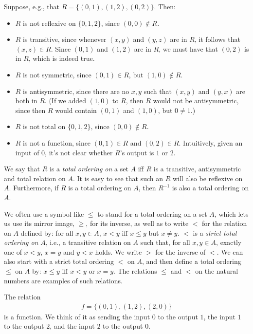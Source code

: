 Suppose, e.g., that $R=\{(0,1),(1,2),(0,2)\}$.
Then:
\begin{itemize}
\item $R$ is not reflexive on $\{0,1,2\}$, since $(0,0)\not\in R$.

\item $R$ is transitive, since whenever $(x,y)$ and $(y,z)$
are in $R$, it follows that $(x,z)\in R$.  Since
$(0,1)$ and $(1,2)$ are in $R$, we must have that $(0,2)$ is in $R$,
which is indeed true.

\item $R$ is not symmetric, since $(0,1)\in R$, but $(1,0)\not\in R$.

\item $R$ is antisymmetric, since there are no $x,y$ such
  that $(x,y)$ and $(y,x)$ are both in $R$.  (If we added
  $(1,0)$ to $R$, then $R$ would not be antisymmetric, since
  then $R$ would contain $(0,1)$ and $(1,0)$, but $0\neq 1$.)

\item $R$ is not total on $\{0,1,2\}$, since $(0,0)\not\in R$.

\item $R$ is not a function, since $(0,1)\in R$ and $(0,2)\in R$.
Intuitively, given an input of $0$, it's not clear whether
$R$'s output is $1$ or $2$.
\end{itemize}

We say that $R$ is a \emph{total ordering on} a set $A$ iff
%
$R$ is a transitive, antisymmetric and total relation on $A$.
It is easy to see that such an $R$ will also be reflexive on $A$.
Furthermore, if $R$ is a total ordering on $A$, then $R^{-1}$ is also a
total ordering on $A$.

We often use a symbol like $\leq$ to stand for a total ordering on a
set $A$, which lets us use its mirror image, $\geq$, for its inverse,
as well as to write $<$ for the relation on $A$ defined by: for all
$x,y\in A$, $x<y$ iff $x\leq y$ but $x\neq y$. $<$ is a \emph{strict
  total ordering on} $A$, i.e., a transitive relation on $A$ such
that, for all $x,y\in A$, exactly one of $x<y$, $x=y$ and $y<x$
holds. We write $>$ for the inverse of $<$.  We can also start with
a strict total ordering $<$ on $A$, and then define a total ordering
$\leq$ on $A$ by: $x\leq y$ iff $x<y$ or $x=y$.
The relations $\leq$ and $<$ on the natural numbers are
examples of such relations.

The relation
\begin{gather*}
f=\{(0,1),(1,2),(2,0)\}
\end{gather*}
is a function.  We think of it as sending the input $0$ to the
output $1$, the input $1$ to the output $2$, and the
input $2$ to the output $0$.

